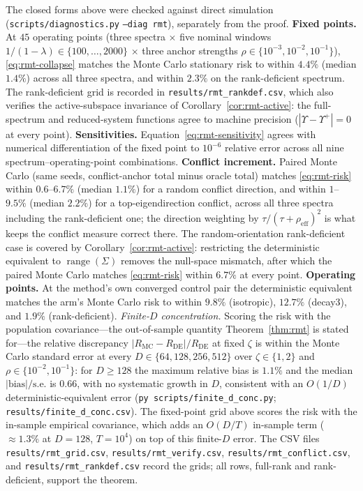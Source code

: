 The closed forms above were checked against direct simulation (\texttt{scripts/diagnostics.py} \texttt{--diag rmt}), separately from the proof.
\textbf{Fixed points.}
At $45$ operating points (three spectra $\times$ five nominal windows $1/(1-\lambda) \in \{100,\dots,2000\}$ $\times$ three anchor strengths $\rho \in \{10^{-3}, 10^{-2}, 10^{-1}\}$), \eqref{eq:rmt-collapse} matches the Monte Carlo stationary risk to within $4.4\%$ (median $1.4\%$) across all three spectra, and within $2.3\%$ on the rank-deficient spectrum.
The rank-deficient grid is recorded in \texttt{results/rmt\_rankdef.csv}, which also verifies the active-subspace invariance of Corollary~\ref{cor:rmt-active}: the full-spectrum and reduced-system functions agree to machine precision ($|\Upsilon-\Upsilon^+| = 0$ at every point).
\textbf{Sensitivities.}
Equation~\eqref{eq:rmt-sensitivity} agrees with numerical differentiation of the fixed point to $10^{-6}$ relative error across all nine spectrum--operating-point combinations.
\textbf{Conflict increment.}
Paired Monte Carlo (same seeds, conflict-anchor total minus oracle total) matches \eqref{eq:rmt-risk} within $0.6$--$6.7\%$ (median $1.1\%$) for a random conflict direction, and within $1$--$9.5\%$ (median $2.2\%$) for a top-eigendirection conflict, across all three spectra including the rank-deficient one; the direction weighting by $\tau/(\tau+\rho_{\mathrm{eff}})^2$ is what keeps the conflict measure correct there.
The random-orientation rank-deficient case is covered by Corollary~\ref{cor:rmt-active}: restricting the deterministic equivalent to $\operatorname{range}(\Sigma)$ removes the null-space mismatch, after which the paired Monte Carlo matches \eqref{eq:rmt-risk} within $6.7\%$ at every point.
\textbf{Operating points.}
At the method's own converged control pair the deterministic equivalent matches the arm's Monte Carlo risk to within $9.8\%$ (isotropic), $12.7\%$ (decay3), and $1.9\%$ (rank-deficient).
\emph{Finite-$D$ concentration.}
Scoring the risk with the population covariance---the out-of-sample quantity Theorem~\ref{thm:rmt} is stated for---the relative discrepancy $|R_{\mathrm{MC}}-R_{\mathrm{DE}}|/R_{\mathrm{DE}}$ at fixed $\zeta$ is within the Monte Carlo standard error at every $D \in \{64,128,256,512\}$ over $\zeta \in \{1,2\}$ and $\rho \in \{10^{-2},10^{-1}\}$: for $D \ge 128$ the maximum relative bias is $1.1\%$ and the median $|\text{bias}|/\text{s.e.}$ is $0.66$, with no systematic growth in $D$, consistent with an $O(1/D)$ deterministic-equivalent error (\texttt{py scripts/finite\_d\_conc.py}; \texttt{results/finite\_d\_conc.csv}).
The fixed-point grid above scores the risk with the in-sample empirical covariance, which adds an $O(D/T)$ in-sample term ($\approx 1.3\%$ at $D=128$, $T=10^4$) on top of this finite-$D$ error.
The CSV files \texttt{results/rmt\_grid.csv}, \texttt{results/rmt\_verify.csv}, \texttt{results/rmt\_conflict.csv}, and \texttt{results/rmt\_rankdef.csv} record the grids; all rows, full-rank and rank-deficient, support the theorem.

